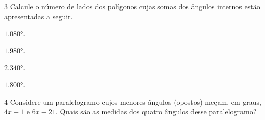 {{\num{3} Calcule o número de lados dos polígonos cujas somas
dos ângulos internos estão apresentadas a seguir.

\begin{escolha}[itemsep=0pt]
\item $1.080°$.
    


    
    

\item $1.980°$.
    





\item $2.340°$.






\item $1.800°$.





\end{escolha}



\num{4} Considere um paralelogramo cujos menores ângulos (opostos)
meçam, em graus, $4x + 1$ e $6x - 21$. Quais são as medidas dos
quatro ângulos desse paralelogramo?



}}
